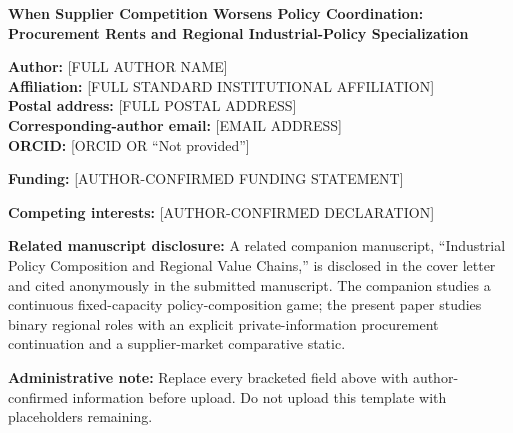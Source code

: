 \documentclass[11pt]{article}
\begin{document}
\begin{center}
{\Large\bfseries When Supplier Competition Worsens Policy Coordination:\\[0.4em]
Procurement Rents and Regional Industrial-Policy Specialization}
\end{center}

\vspace{2em}

\noindent\textbf{Author:} [FULL AUTHOR NAME]\\
\textbf{Affiliation:} [FULL STANDARD INSTITUTIONAL AFFILIATION]\\
\textbf{Postal address:} [FULL POSTAL ADDRESS]\\
\textbf{Corresponding-author email:} [EMAIL ADDRESS]\\
\textbf{ORCID:} [ORCID OR ``Not provided'']

\vspace{1.5em}

\noindent\textbf{Funding:} [AUTHOR-CONFIRMED FUNDING STATEMENT]

\vspace{1em}

\noindent\textbf{Competing interests:} [AUTHOR-CONFIRMED DECLARATION]

\vspace{1em}

\noindent\textbf{Related manuscript disclosure:} A related companion manuscript, ``Industrial Policy Composition and Regional Value Chains,'' is disclosed in the cover letter and cited anonymously in the submitted manuscript. The companion studies a continuous fixed-capacity policy-composition game; the present paper studies binary regional roles with an explicit private-information procurement continuation and a supplier-market comparative static.

\vspace{1em}

\noindent\textbf{Administrative note:} Replace every bracketed field above with author-confirmed information before upload. Do not upload this template with placeholders remaining.
\end{document}
